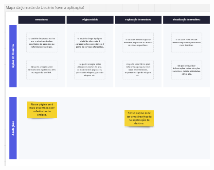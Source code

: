 \documentclass{article}
\begin{document}
\begin{figure}[H]
      \centering
      \includegraphics [width=1\textwidth]{IMGDOC/MapaSemA1.png}
      \label{mapa sem a1}
\end{figure}
\end{document}
